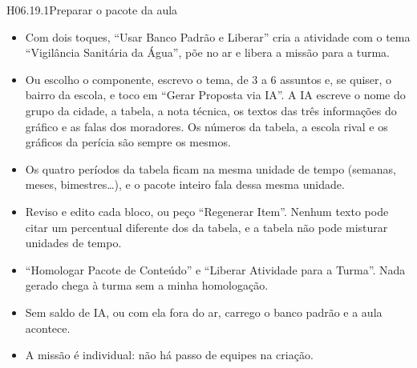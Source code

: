 \begin{historia}{H06.19.1}{Preparar o pacote da aula}{\pronto}
\aceite
\begin{itemize}
  \item Com dois toques, \enquote{Usar Banco Padrão e Liberar} cria a
    atividade com o tema \enquote{Vigilância Sanitária da Água}, põe no ar e
    libera a missão para a turma.
  \item Ou escolho o componente, escrevo o tema, de 3 a 6 assuntos e, se
    quiser, o bairro da escola, e toco em \enquote{Gerar Proposta via IA}. A
    IA escreve o nome do grupo da cidade, a tabela, a nota técnica, os textos
    das três informações do gráfico e as falas dos moradores. Os números da
    tabela, a escola rival e os gráficos da perícia são sempre os mesmos.
  \item Os quatro períodos da tabela ficam na mesma unidade de tempo
    (semanas, meses, bimestres\ldots), e o pacote inteiro fala dessa mesma
    unidade.
  \item Reviso e edito cada bloco, ou peço \enquote{Regenerar Item}. Nenhum
    texto pode citar um percentual diferente dos da tabela, e a tabela não
    pode misturar unidades de tempo.
  \item \enquote{Homologar Pacote de Conteúdo} e \enquote{Liberar Atividade
    para a Turma}. Nada gerado chega à turma sem a minha homologação.
  \item Sem saldo de IA, ou com ela fora do ar, carrego o banco padrão e a
    aula acontece.
  \item A missão é individual: não há passo de equipes na criação.
\end{itemize}
\end{historia}

